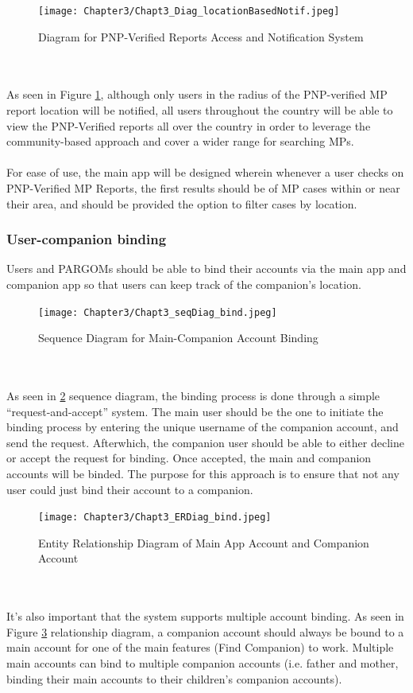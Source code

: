 \begin{figure}[!h]
    \centering
    \texttt{[image: Chapter3/Chapt3\_Diag\_locationBasedNotif.jpeg]}
    \caption{Diagram for PNP-Verified Reports Access and Notification System}
    \label{fig:diagramLocation}
\end{figure}
\\\\As seen in Figure \ref{fig:diagramLocation}, although only users in the radius of the PNP-verified MP report location will be notified, all users throughout the country will be able to view the PNP-Verified reports all over the country in order to leverage the community-based approach and cover a wider range for searching MPs. 
\\\\For ease of use, the main app will be designed wherein whenever a user checks on PNP-Verified MP Reports, the first results should be of MP cases within or near their area, and should be provided the option to filter cases by location.

\subsubsection{User-companion binding}
Users and PARGOMs should be able to bind their accounts via the main app and companion app so that users can keep track of the companion’s location.

\begin{figure}[!h]
    \centering
    \texttt{[image: Chapter3/Chapt3\_seqDiag\_bind.jpeg]}
    \caption{Sequence Diagram for Main-Companion Account Binding}
    \label{fig:seqDiaBind}
\end{figure}
\\\\As seen in \ref{fig:seqDiaBind} sequence diagram, the binding process is done through a simple “request-and-accept” system. The main user should be the one to initiate the binding process by entering the unique username of the companion account, and send the request. Afterwhich, the companion user should be able to either decline or accept the request for binding. Once accepted, the main and companion accounts will be binded. The purpose for this approach is to ensure that not any user could just bind their account to a companion.

\begin{figure}[!h]
    \centering
    \texttt{[image: Chapter3/Chapt3\_ERDiag\_bind.jpeg]}
    \caption{Entity Relationship Diagram of Main App Account and Companion Account}
    \label{fig:ERDBind}
\end{figure}
\\\\It’s also important that the system supports multiple account binding. As seen in Figure \ref{fig:ERDBind} relationship diagram, a companion account should always be bound to a main account for one of the main features (Find Companion) to work. Multiple main accounts can bind to multiple companion accounts (i.e. father and mother, binding their main accounts to their children’s companion accounts).

